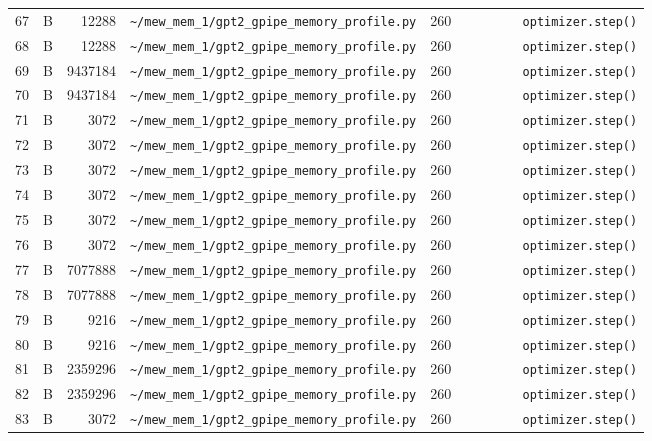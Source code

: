 \documentclass{article}
\begin{document}
\begin{longtable}{r l r p{6.5cm} r p{7.0cm}}
67 & B & 12288 & \lstinline|~/mew_mem_1/gpt2_gpipe_memory_profile.py| & 260 & \lstinline|        optimizer.step()| \\
68 & B & 12288 & \lstinline|~/mew_mem_1/gpt2_gpipe_memory_profile.py| & 260 & \lstinline|        optimizer.step()| \\
69 & B & 9437184 & \lstinline|~/mew_mem_1/gpt2_gpipe_memory_profile.py| & 260 & \lstinline|        optimizer.step()| \\
70 & B & 9437184 & \lstinline|~/mew_mem_1/gpt2_gpipe_memory_profile.py| & 260 & \lstinline|        optimizer.step()| \\
71 & B & 3072 & \lstinline|~/mew_mem_1/gpt2_gpipe_memory_profile.py| & 260 & \lstinline|        optimizer.step()| \\
72 & B & 3072 & \lstinline|~/mew_mem_1/gpt2_gpipe_memory_profile.py| & 260 & \lstinline|        optimizer.step()| \\
73 & B & 3072 & \lstinline|~/mew_mem_1/gpt2_gpipe_memory_profile.py| & 260 & \lstinline|        optimizer.step()| \\
74 & B & 3072 & \lstinline|~/mew_mem_1/gpt2_gpipe_memory_profile.py| & 260 & \lstinline|        optimizer.step()| \\
75 & B & 3072 & \lstinline|~/mew_mem_1/gpt2_gpipe_memory_profile.py| & 260 & \lstinline|        optimizer.step()| \\
76 & B & 3072 & \lstinline|~/mew_mem_1/gpt2_gpipe_memory_profile.py| & 260 & \lstinline|        optimizer.step()| \\
77 & B & 7077888 & \lstinline|~/mew_mem_1/gpt2_gpipe_memory_profile.py| & 260 & \lstinline|        optimizer.step()| \\
78 & B & 7077888 & \lstinline|~/mew_mem_1/gpt2_gpipe_memory_profile.py| & 260 & \lstinline|        optimizer.step()| \\
79 & B & 9216 & \lstinline|~/mew_mem_1/gpt2_gpipe_memory_profile.py| & 260 & \lstinline|        optimizer.step()| \\
80 & B & 9216 & \lstinline|~/mew_mem_1/gpt2_gpipe_memory_profile.py| & 260 & \lstinline|        optimizer.step()| \\
81 & B & 2359296 & \lstinline|~/mew_mem_1/gpt2_gpipe_memory_profile.py| & 260 & \lstinline|        optimizer.step()| \\
82 & B & 2359296 & \lstinline|~/mew_mem_1/gpt2_gpipe_memory_profile.py| & 260 & \lstinline|        optimizer.step()| \\
83 & B & 3072 & \lstinline|~/mew_mem_1/gpt2_gpipe_memory_profile.py| & 260 & \lstinline|        optimizer.step()| \\

\end{longtable}
\end{document}
